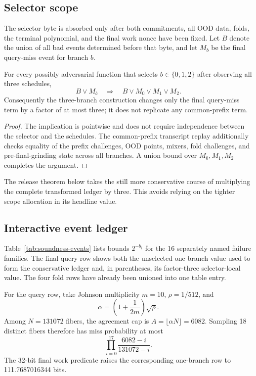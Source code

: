 \subsection{Selector scope}

The selector byte is absorbed only after both commitments, all OOD data,
folds, the terminal polynomial, and the final work nonce have been fixed.
Let \(B\) denote the union of all bad events determined before that byte, and
let \(M_b\) be the final query-miss event for branch \(b\).

\begin{lemma}
\label{lem:selector-soundness}
For every possibly adversarial function that selects
\(b\in\{0,1,2\}\) after observing all three schedules,
\[
 B\lor M_b\quad\Longrightarrow\quad B\lor M_0\lor M_1\lor M_2.
\]
Consequently the three-branch construction changes only the final query-miss
term by a factor of at most three; it does not replicate any common-prefix
term.
\end{lemma}

\begin{proof}
The implication is pointwise and does not require independence between the
selector and the schedules.  The common-prefix transcript replay additionally
checks equality of the prefix challenges, OOD points, mixers, fold challenges,
and pre-final-grinding state across all branches.  A union bound over
\(M_0,M_1,M_2\) completes the argument.
\end{proof}

The release theorem below takes the still more conservative course of
multiplying the complete transformed ledger by three.  This avoids relying on
the tighter scope allocation in its headline value.

\subsection{Interactive event ledger}

Table~\ref{tab:soundness-events} lists bounds \(2^{-b_i}\) for the 16
separately named failure families.  The final-query row shows both the
unselected one-branch value used to form the conservative ledger and, in
parentheses, its factor-three selector-local value.  The four fold rows have
already been unioned into one table entry.

For the query row, take Johnson multiplicity \(m=10\),
\(\rho=1/512\), and
\[
 \alpha=\left(1+\frac{1}{2m}\right)\sqrt{\rho}.
\]
Among \(N=131072\) fibers, the agreement cap is
\(A=\lfloor\alpha N\rfloor=6082\).  Sampling 18 distinct fibers therefore
has miss probability at most
\[
 \prod_{i=0}^{17}\frac{6082-i}{131072-i}.
\]
The 32-bit final work predicate raises the corresponding one-branch row to
111.7687016344 bits.

